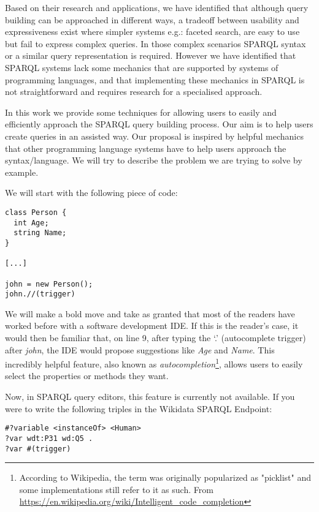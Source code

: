 Based on their research and applications, we have identified that although query building can be approached in different ways, 
a tradeoff between usability and expressiveness exist where simpler systems e.g.: 
faceted search, are easy to use but fail to express complex queries. 
In those complex scenarios SPARQL syntax or a similar query representation is required. 
However we have identified that SPARQL systems lack some mechanics that are supported by systems of programming languages, 
and that implementing these mechanics in SPARQL is not straightforward and requires research for a specialised approach.

In this work we provide some techniques for allowing users to easily and efficiently approach the SPARQL query building process. 
Our aim is to help users create queries in an assisted way. 
Our proposal is inspired by helpful mechanics that other programming language systems have to help users approach the syntax/language. 
We will try to describe the problem we are trying to solve by example. 

We will start with the following piece of code:
\begin{verbatim}
class Person {
  int Age;
  string Name;
}

[...]

john = new Person();
john.//(trigger)
\end{verbatim}

We will make a bold move and take as granted that most of the readers have worked before with a software development IDE. 
If this is the reader’s case, it would then be familiar that, on line 9, after typing the ‘.’ (autocomplete trigger) after \textit{john}, 
the IDE would propose suggestions like \textit{Age} and \textit{Name}. 
This incredibly helpful feature, also known as \textit{autocompletion}\footnote{According to Wikipedia, the term was originally popularized as "picklist" and some implementations still refer to it as such. 
From \url{https://en.wikipedia.org/wiki/Intelligent_code_completion}}, allows users to easily select the properties or methods they want. 

Now, in SPARQL query editors, this feature is currently not available. 
If you were to write the following triples in the Wikidata SPARQL Endpoint:

\begin{verbatim}
#?variable <instanceOf> <Human> 
?var wdt:P31 wd:Q5 .
?var #(trigger)
\end{verbatim}

